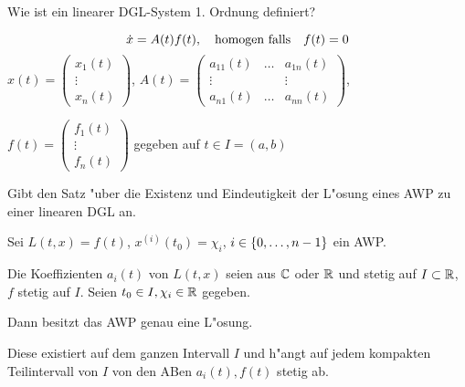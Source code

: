 \documentclass[9pt]{article}
\newcommand{\R}[1]{%
	\ifthenelse{\equal{#1}{}}
	{\mathbb{R}}
	{\mathbb{R}^{#1}}}%
\newcommand{\C}[1]{%
	\ifthenelse{\equal{#1}{}}
	{\mathbb{C}}
	{\mathbb{C}^{#1}}}%
\newenvironment{field}{}{\newpage}
\newif\ifnote
\newenvironment{note}{\notetrue}{\notefalse}
\newcommand{\localtag}{}
\newcommand{\globaltag}{}
\newcommand{\uuid}{}
\newcommand{\tags}[1]{
    \ifnote 
        \renewcommand{\localtag}{#1}
    \else
        \renewcommand{\globaltag}{#1}
    \fi 
    }
\newcommand{\xplain}[1]{\renewcommand{\uuid}{#1}}
\begin{document}
\begin{note}
	\xplain{006d7d21-f93d-4cbe-8c80-77702a0f32ee}
	\tags{definition, satz LDGL, 3.7}
	
	\begin{field}  %
		Wie ist ein linearer DGL-System 1. Ordnung definiert?
	\end{field}
	
	\begin{field}  %
		\begin{equation*}
		\dot{x} = A(t) f(t), \qq{homogen falls} f(t) =0
		\end{equation*}
		\footnotesize
		$x(t) = \begin{pmatrix}x_1(t) \\ \vdots \\ x_n(t) \end{pmatrix}$, \quad $A(t)=
			\begin{pmatrix}
				a_{11}(t) & \dots & a_{1n}(t) \\
				\vdots    &       & \vdots \\
				a_{n1}(t) & \dots & a_{nn}(t) 
			\end{pmatrix}$,
		
		
		$f(t) = 
			\begin{pmatrix}
				f_1(t) \\ \vdots \\ f_n(t)
			\end{pmatrix}$
		gegeben auf $t\in I = (a,b)$
	\end{field}
		
	\begin{field}  %
		Gibt den Satz "uber die
		Existenz und Eindeutigkeit der L"osung eines AWP zu einer linearen DGL an.
	\end{field}
	
	\begin{field}  %
		Sei $L(t,x)=f(t)$, $x^{(i)}(t_0) = \chi_i$, $i \in \qty{0,\dots, n-1}$ ein AWP.
		
		Die Koeffizienten $a_i(t)$ von $L(t,x)$ seien aus $\C{}$ oder $\R{}$ und stetig auf $I \subset \R{}$, $f$ stetig auf $I$. Seien $t_0\in I, \chi_i \in \R{}$  gegeben.
		
		 Dann besitzt das AWP genau eine L"osung.
		 
		 Diese existiert auf dem ganzen Intervall $I$ und h"angt auf jedem kompakten Teilintervall von $I$ von den ABen $a_i(t),f(t)$ stetig ab.
	\end{field}
\end{note}
\end{document}
